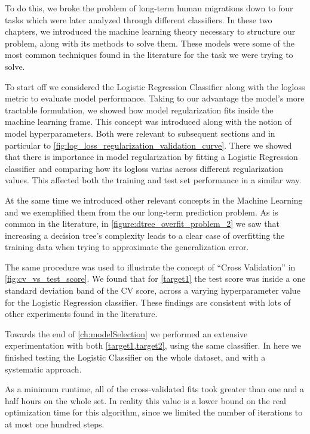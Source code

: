 To do this, we broke the problem of long-term human migrations down to four tasks which were later analyzed through different classifiers.
In these two chapters, we introduced the machine learning theory necessary to structure our problem, along with its methods to solve them.
These models were some of the most common techniques found in the literature for the task we were trying to solve.

To start off we considered the Logistic Regression Classifier along with the logloss metric to evaluate model performance.
Taking to our advantage the model's more tractable formulation, we showed how model regularization fits inside the machine learning frame.
This concept was introduced along with the notion of model hyperparameters.
Both were relevant to subsequent sections and in particular to \cref{fig:log_loss_regularization_validation_curve}.
There we showed that there is importance in model regularization by fitting a Logistic Regression classifier and comparing how its logloss varias across different regularization values.
This affected both the training and test set performance in a similar way.


At the same time we introduced other relevant concepts in the Machine Learning and we exemplified them from the our long-term prediction problem.
As is common in the literature, in \cref{figure:dtree_overfit_problem_2} we saw that increasing a decision tree's complexity leads to a clear case of overfitting the training data when trying to approximate the generalization error.

The same procedure was used to illustrate the concept of ``Cross Validation'' in \cref{fig:cv_vs_test_score}.
We found that for \cref{target1} the test score was inside a one standard deviation band of the CV score, across a varying hyperparameter value for the Logistic Regression classifier.
These findings are consistent with lots of other experiments found in the literature.


Towards the end of \cref{ch:modelSelection} we performed an extensive experimentation with both \cref{target1,target2}, using the same classifier.
In here we finished testing the Logistic Classifier on the whole dataset, and with a systematic approach.

As a minimum runtime, all of the cross-validated fits took greater than one and a half hours on the whole set.
In reality this value is a lower bound on the real optimization time for this algorithm, since we limited the number of iterations to at most one hundred steps.

